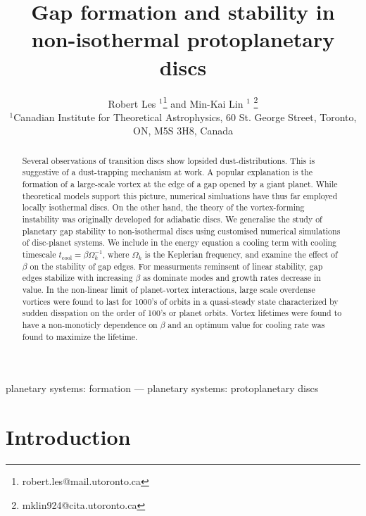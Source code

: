 \documentclass[useAMS,usenatbib]{mn2e}
\title[Gaps in non-isothermal discs]{Gap formation and stability in 
  non-isothermal protoplanetary discs}
\author[Les and Lin]{Robert Les
  $^1$\thanks{robert.les@mail.utoronto.ca} and Min-Kai Lin $^1$
  \thanks{ mklin924@cita.utoronto.ca} \\ 
$^1$Canadian Institute for Theoretical Astrophysics,  
60 St. George Street, Toronto, ON, M5S 3H8, Canada \\
}
\begin{document}
\maketitle
\begin{abstract}
Several observations of transition discs show lopsided
dust-distributions. This is suggestive of a dust-trapping mechanism at work. A
popular explanation is the formation of a large-scale vortex at the
edge of a gap opened by a giant planet. While theoretical models
support this picture, numerical simluations have thus far
employed locally isothermal discs. On the other hand, the theory of the
vortex-forming instability was originally developed for adiabatic
discs. We generalise the study of planetary gap stability to non-isothermal
discs using customised numerical simulations of disc-planet
systems. We include in the energy equation a cooling term with cooling
timescale $t_\mathrm{cool}=\beta\Omega_k^{-1}$, where $\Omega_k$ is
the Keplerian frequency, and examine the effect of $\beta$ on the
stability of gap edges. For measurments reminsent of linear stability, gap edges stabilize with increasing $\beta$ as dominate modes and growth rates decrease in value. In the non-linear limit of planet-vortex interactions, large scale overdense vortices were found to last for 1000's of orbits in a quasi-steady state characterized by sudden disspation on the order of 100's or planet orbits. Vortex lifetimes were found to have a non-monoticly dependence on $\beta$ and an optimum value for cooling rate was found to maximize the lifetime. 


\end{abstract}

\begin{keywords}
planetary systems: formation --- planetary systems:
protoplanetary discs
\end{keywords}


\section{Introduction}\label{intro}



%
%





\appendix
%
%
\end{document}
